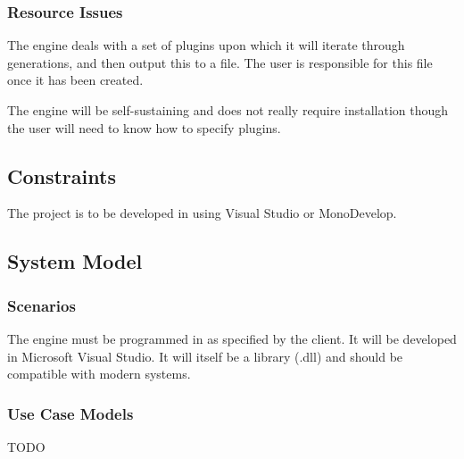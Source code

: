 \subsubsection{Resource Issues}
The engine deals with a set of plugins upon which it will iterate through generations, and then output this to a file. The user is responsible for this file once it has been created. 

The engine will be self-sustaining and does not really require installation though the user will need to know how to specify plugins.

\subsection{Constraints}
The project is to be developed in \csharp using Visual Studio or MonoDevelop.
\subsection{System Model}

\subsubsection{Scenarios}
The engine must be programmed in \csharp as specified by the client. It will be developed in Microsoft Visual Studio. It will itself be a library (.dll) and should be compatible with modern systems.

\subsubsection{Use Case Models}
TODO
